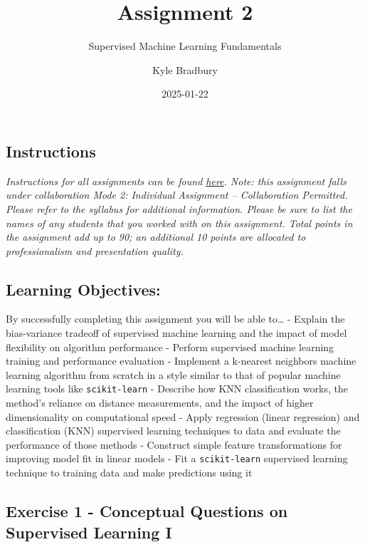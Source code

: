 \documentclass[
  letterpaper,
  DIV=11,
  numbers=noendperiod]{scrartcl}
\title{Assignment 2}
\subtitle{Supervised Machine Learning Fundamentals}
\author{Kyle Bradbury}
\date{2025-01-22}
\renewcommand*\contentsname{Table of contents}
\newcommand\contentsname{Table of contents}
\begin{document}
\maketitle

\renewcommand*\contentsname{Table of contents}
{
\hypersetup{linkcolor=}
\setcounter{tocdepth}{1}
\tableofcontents
}

\subsection{Instructions}\label{instructions}

\emph{Instructions for all assignments can be found
\href{https://kylebradbury.github.io/ids705/notebooks/assignment_instructions.html}{here}.
Note: this assignment falls under collaboration Mode 2: Individual
Assignment -- Collaboration Permitted. Please refer to the syllabus for
additional information. Please be sure to list the names of any students
that you worked with on this assignment. Total points in the assignment
add up to 90; an additional 10 points are allocated to professionalism
and presentation quality.}

\subsection{Learning Objectives:}\label{learning-objectives}

By successfully completing this assignment you will be able to\ldots{} -
Explain the bias-variance tradeoff of supervised machine learning and
the impact of model flexibility on algorithm performance - Perform
supervised machine learning training and performance evaluation -
Implement a k-nearest neighbors machine learning algorithm from scratch
in a style similar to that of popular machine learning tools like
\texttt{scikit-learn} - Describe how KNN classification works, the
method's reliance on distance measurements, and the impact of higher
dimensionality on computational speed - Apply regression (linear
regression) and classification (KNN) supervised learning techniques to
data and evaluate the performance of those methods - Construct simple
feature transformations for improving model fit in linear models - Fit a
\texttt{scikit-learn} supervised learning technique to training data and
make predictions using it

\subsection{Exercise 1 - Conceptual Questions on Supervised Learning
I}\label{exercise-1---conceptual-questions-on-supervised-learning-i}
\end{document}
